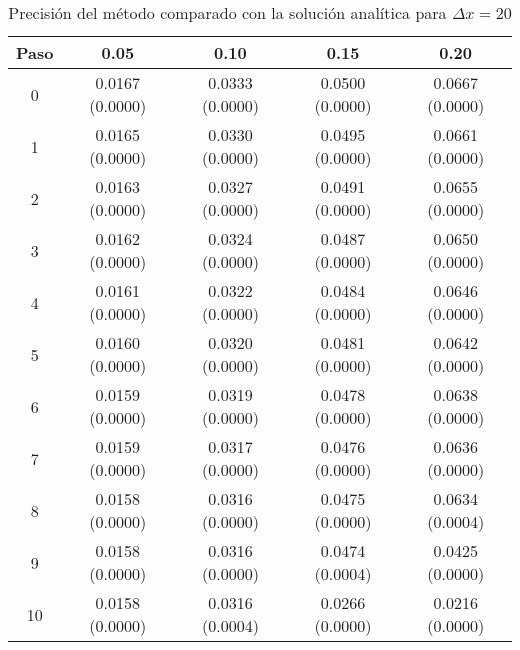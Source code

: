 \documentclass[11pt]{article}
\begin{document}
\begin{table}
\begin{tabular}{ c c c c c }
\hline
Paso & 0.05 & 0.10 & 0.15 & 0.20 \\
\hline
\hline
0 & 0.0167 (0.0000) & 0.0333 (0.0000) & 0.0500 (0.0000) & 0.0667 (0.0000) \\
1 & 0.0165 (0.0000) & 0.0330 (0.0000) & 0.0495 (0.0000) & 0.0661 (0.0000) \\
2 & 0.0163 (0.0000) & 0.0327 (0.0000) & 0.0491 (0.0000) & 0.0655 (0.0000) \\
3 & 0.0162 (0.0000) & 0.0324 (0.0000) & 0.0487 (0.0000) & 0.0650 (0.0000) \\
4 & 0.0161 (0.0000) & 0.0322 (0.0000) & 0.0484 (0.0000) & 0.0646 (0.0000) \\
5 & 0.0160 (0.0000) & 0.0320 (0.0000) & 0.0481 (0.0000) & 0.0642 (0.0000) \\
6 & 0.0159 (0.0000) & 0.0319 (0.0000) & 0.0478 (0.0000) & 0.0638 (0.0000) \\
7 & 0.0159 (0.0000) & 0.0317 (0.0000) & 0.0476 (0.0000) & 0.0636 (0.0000) \\
8 & 0.0158 (0.0000) & 0.0316 (0.0000) & 0.0475 (0.0000) & 0.0634 (0.0004) \\
9 & 0.0158 (0.0000) & 0.0316 (0.0000) & 0.0474 (0.0004) & 0.0425 (0.0000) \\
10 & 0.0158 (0.0000) & 0.0316 (0.0004) & 0.0266 (0.0000) & 0.0216 (0.0000) \\
\end{tabular}

\caption{Precisión del método comparado con la solución analítica para $\Delta{x} = 20$}
\label{eq:compartiva2}
\end{table}
\end{document}

